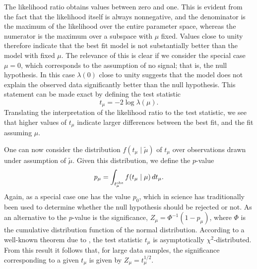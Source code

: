The likelihood ratio obtains values between zero and one. This is evident from the fact that the likelihood itself is always nonnegative, and the denominator is the maximum of the likelihood over the entire parameter space, whereas the numerator is the maximum over a subspace with $\mu$ fixed. Values close to unity therefore indicate that the best fit model is not substantially better than the model with fixed $\mu$. The relevance of this is clear if we consider the special case $\mu=0$, which corresponds to the assumption of no signal; that is, the null hypothesis. In this case $\lambda(0)$ close to unity suggests that the model does not explain the observed data significantly better than the null hypothesis. This statement can be made exact by defining the test statistic
\begin{equation}
    t_\mu=-2\log\lambda(\mu).
\end{equation}
Translating the interpretation of the likelihood ratio to the test statistic, we see that higher values of $t_\mu$ indicate larger differences between the best fit, and the fit assuming $\mu$.

One can now consider the distribution $f(t_\mu\mid\tilde{\mu})$ of $t_\mu$ over observations drawn under assumption of $\tilde{\mu}$. Given this distribution, we define the $p$-value
\begin{equation}
    p_\mu=\int_{t_\mu^\text{obs}}f(t_\mu\mid\mu)\,d t_\mu.
\end{equation}
Again, as a special case one has the value $p_0$, which in science has traditionally been used to determine whether the null hypothesis should be rejected or not. As an alternative to the $p$-value is the significance, $Z_\mu=\Phi^{-1}(1-p_\mu)$, where $\Phi$ is the cumulative distribution function of the normal distribution. According to a well-known theorem due to \textcite{Wilks1938}, the test statistic $t_\mu$ is asymptotically $\chi^2$-distributed. From this result it follows that, for large data samples, the significance corresponding to a given $t_\mu$ is given by $Z_\mu=t_\mu^{1/2}$.

